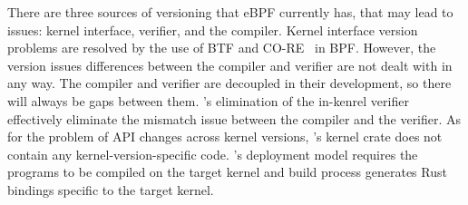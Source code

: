 \label{discussion:versions}
There are three sources of versioning that eBPF currently has, that may lead to issues: kernel interface, verifier, and the compiler.
Kernel interface version problems are resolved by the use of BTF and CO-RE~\cite{bpf-core} in BPF.
However, the version issues differences between the compiler and verifier are not dealt
    with in any way.
The compiler and verifier are decoupled in their development, so there will
    always be gaps between them.
\projname{}'s elimination of the in-kenrel verifier effectively eliminate the
    mismatch issue between the compiler and the verifier.
As for the problem of API changes across kernel versions, \projname{}'s kernel
    crate does not contain any kernel-version-specific code.
\projname{}'s deployment model requires the programs to be compiled on the
    target kernel and build process generates Rust bindings specific to the
    target kernel.






